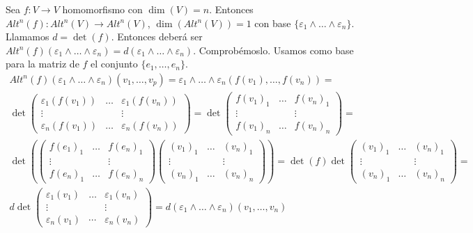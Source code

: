\documentclass[CV.tex]{subfiles}
\begin{document}
Sea $f:V\to V$ homomorfismo con $\dim(V)=n$. Entonces $Alt^n(f):Alt^n(V)\to Alt^n(V)$, $\dim(Alt^n(V))=1$ con base $\{\varepsilon_1\land\dots\land\varepsilon_n\}$. Llamamos $d=\det(f)$. Entonces deberá ser $Alt^n(f)(\varepsilon_1\land\dots\land\varepsilon_n)=d(\varepsilon_1\land\dots\land\varepsilon_n)$. Comprobémoslo. Usamos como base para la matriz de $f$ el conjunto $\{e_1,\dots, e_n\}$.
\begin{gather*}
Alt^n(f)(\varepsilon_1\land\dots\land\varepsilon_n)(v_1,\dots, v_p)=\varepsilon_1\land\dots\land \varepsilon_n(f(v_1),\dots, f(v_n))=\\
\det\begin{pmatrix}
\varepsilon_1(f(v_1)) & \dots & \varepsilon_1(f(v_n))\\
\vdots & & \vdots\\
\varepsilon_n(f(v_1)) & \dots & \varepsilon_n(f(v_n))
\end{pmatrix}=\det\begin{pmatrix}
f(v_1)_1 & \dots & f(v_n)_1\\
\vdots & & \vdots\\
f(v_1)_n & \dots & f(v_n)_n
\end{pmatrix}=\\
\det\left(\begin{pmatrix}
f(e_1)_1 & \dots & f(e_n)_1\\
\vdots & & \vdots\\
f(e_n)_1 & \dots & f(e_n)_n
\end{pmatrix}\begin{pmatrix}
(v_1)_1 & \dots & (v_n)_1\\
\vdots & & \vdots\\
(v_n)_1 & \dots & (v_n)_n
\end{pmatrix}\right)=\det(f)\det\begin{pmatrix}
(v_1)_1 & \dots & (v_n)_1\\
\vdots & & \vdots\\
(v_n)_1 & \dots & (v_n)_n
\end{pmatrix}=\\d\det\begin{pmatrix}
\varepsilon_1(v_1) & \dots &\varepsilon_1(v_n)\\
\vdots & &\vdots \\
\varepsilon_n(v_1) & \cdots & \varepsilon_n(v_n)
\end{pmatrix}=d (\varepsilon_1\land\dots\land\varepsilon_n)(v_1,\dots, v_n)
\end{gather*}
\end{document}
